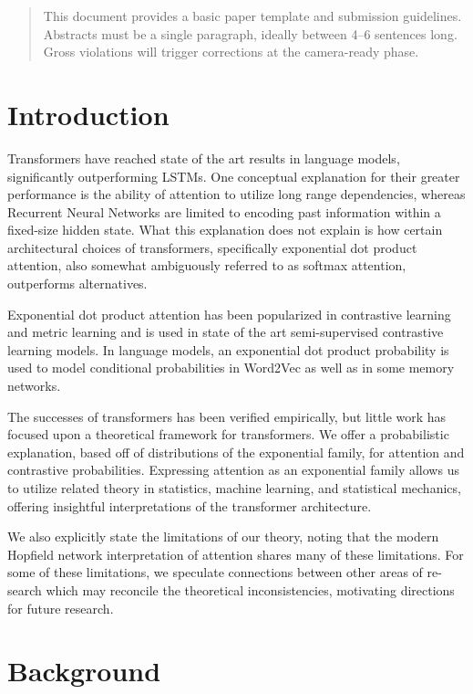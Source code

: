 \documentclass{article}
\begin{document}
\begin{abstract}
This document provides a basic paper template and submission guidelines.
Abstracts must be a single paragraph, ideally between 4--6 sentences long.
Gross violations will trigger corrections at the camera-ready phase.
\end{abstract}

\section{Introduction}
\label{introduction}

Transformers have reached state of the art results in language models, significantly outperforming LSTMs. One conceptual explanation for their greater performance is the ability of attention to utilize long range dependencies, whereas Recurrent Neural Networks are limited to encoding past information within a fixed-size hidden state. 
What this explanation does not explain is how certain architectural choices of transformers, specifically exponential dot product attention, also somewhat ambiguously referred to as softmax attention, outperforms alternatives.

Exponential dot product attention has been popularized in contrastive learning and metric learning and is used in state of the art semi-supervised contrastive learning models.
In language models, an exponential dot product probability is used to model conditional probabilities in Word2Vec as well as in some memory networks. 

The successes of transformers has been verified empirically, but little work
has focused upon a theoretical framework for transformers. 
We offer a probabilistic explanation, based off of distributions of the exponential
family, for attention and contrastive probabilities. 
Expressing attention as an exponential family allows us to utilize related theory in statistics, machine learning, and statistical mechanics, offering insightful interpretations of the transformer architecture.

We also explicitly state the limitations of our theory, noting that the modern
Hopfield network interpretation of attention shares many of these limitations. For
some of these limitations, we speculate connections between other areas of re-
search which may reconcile the theoretical inconsistencies, motivating directions
for future research.

\section{Background}
\label{background}
\end{document}
